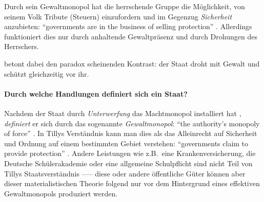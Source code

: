 Durch sein Gewaltmonopol hat die herrschende Gruppe die Möglichkeit, von seinem Volk Tribute (Steuern) einzufordern und im Gegenzug \emph{Sicherheit} anzubieten: ``governments are in the business of selling protection'' \parencite[175]{Tilly-1985-aa}.
Allerdings funktioniert dies nur durch anhaltende Gewaltpräsenz und durch Drohungen des Herrschers.

\citeauthor{Tilly-1985-aa} betont dabei den paradox scheinenden Kontrast: der Staat droht mit Gewalt und schützt gleichzeitig vor ihr.


\paragraph{Durch welche Handlungen definiert sich ein Staat?}

Nachdem der Staat durch \emph{Unterwerfung} das Machtmonopol installiert hat \parencite[vgl.][175]{Tilly-1985-aa}, \emph{definiert} er sich durch das sogenannte \emph{Gewaltmonopol}: ``the authority's monopoly of force'' \parencite[vgl.][172]{Tilly-1985-aa}.
In Tillys Verständnis kann man dies als das Alleinrecht auf Sicherheit und Ordnung auf einem bestimmten Gebiet verstehen: ``governments claim to provide protection'' \parencite[vgl.][172]{Tilly-1985-aa}.
Andere Leistungen wie z.B.\ eine Krankenversicherung, die Deutsche Schülerakademie oder eine allgemeine Schulpflicht sind nicht Teil von Tillys Staatsverständnis \parencite[vgl.][181]{Tilly-1985-aa} ––– diese oder andere öffentliche Güter können aber dieser materialistischen Theorie folgend nur vor dem Hintergrund eines effektiven Gewaltmonopols produziert werden.